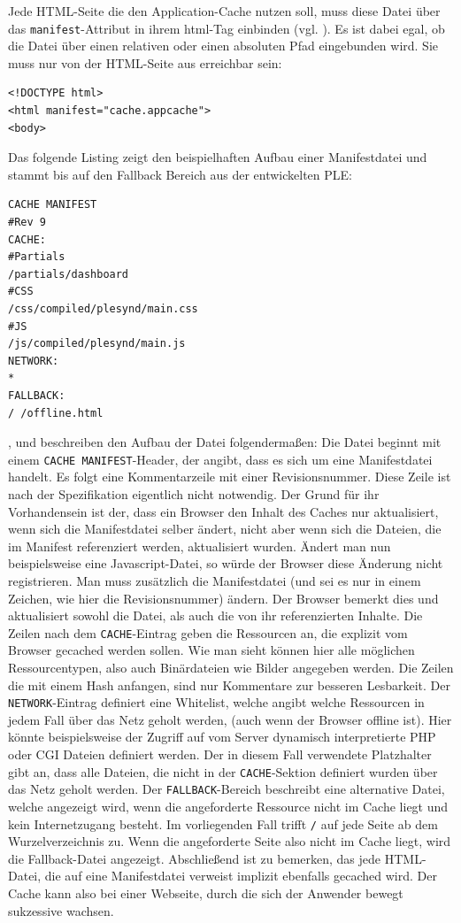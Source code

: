 Jede HTML-Seite die den Application-Cache nutzen soll, muss diese Datei über das \texttt{manifest}-Attribut in ihrem html-Tag einbinden (vgl. \cite{html5upandrunningchapter8}). Es ist dabei egal, ob die Datei über einen relativen oder einen absoluten Pfad eingebunden wird. Sie muss nur von der HTML-Seite aus erreichbar sein:
\begin{lstlisting}
<!DOCTYPE html>
<html manifest="cache.appcache">
<body>
\end{lstlisting}

Das folgende Listing zeigt den beispielhaften Aufbau einer Manifestdatei und stammt bis auf den Fallback Bereich aus der entwickelten PLE:
\begin{lstlisting}
CACHE MANIFEST
#Rev 9
CACHE:
#Partials
/partials/dashboard
#CSS
/css/compiled/plesynd/main.css
#JS
/js/compiled/plesynd/main.js
NETWORK:
*
FALLBACK:
/ /offline.html
\end{lstlisting}

\cite{W3C2012}, \cite{html5upandrunningchapter8} und \cite{Bidelman2010} beschreiben den Aufbau der Datei folgendermaßen: Die Datei beginnt mit einem \texttt{CACHE MANIFEST}-Header, der angibt, dass es sich um eine Manifestdatei handelt. Es folgt eine Kommentarzeile mit einer Revisionsnummer. Diese Zeile ist nach der Spezifikation eigentlich nicht notwendig. Der Grund für ihr Vorhandensein ist der, dass ein Browser den Inhalt des Caches nur aktualisiert, wenn sich die Manifestdatei selber ändert, nicht aber wenn sich die Dateien, die im Manifest referenziert werden, aktualisiert wurden. Ändert man nun beispielsweise eine Javascript-Datei, so würde der Browser diese Änderung nicht registrieren. Man muss zusätzlich die Manifestdatei (und sei es nur in einem Zeichen, wie hier die Revisionsnummer) ändern. Der Browser bemerkt dies und aktualisiert sowohl die Datei, als auch die von ihr referenzierten Inhalte. Die Zeilen nach dem \texttt{CACHE}-Eintrag geben die Ressourcen an, die explizit vom Browser gecached werden sollen. Wie man sieht können hier alle möglichen Ressourcentypen, also auch Binärdateien wie Bilder angegeben werden. Die Zeilen die mit einem Hash anfangen, sind nur Kommentare zur besseren Lesbarkeit. Der \texttt{NETWORK}-Eintrag definiert eine Whitelist, welche angibt welche Ressourcen in jedem Fall über das Netz geholt werden, (auch wenn der Browser offline ist). Hier könnte beispielsweise der Zugriff auf vom Server dynamisch interpretierte PHP oder CGI Dateien definiert werden. Der in diesem Fall verwendete Platzhalter gibt an, dass alle Dateien, die nicht in der \texttt{CACHE}-Sektion definiert wurden über das Netz geholt werden. Der \texttt{FALLBACK}-Bereich beschreibt eine alternative Datei, welche angezeigt wird, wenn die angeforderte Ressource nicht im Cache liegt und kein Internetzugang besteht. Im vorliegenden Fall trifft \texttt{/} auf jede Seite ab dem Wurzelverzeichnis zu. Wenn die angeforderte Seite also nicht im Cache liegt, wird die Fallback-Datei angezeigt. Abschließend ist zu bemerken, das jede HTML-Datei, die auf eine Manifestdatei verweist implizit ebenfalls gecached wird. Der Cache kann also bei einer Webseite, durch die sich der Anwender bewegt sukzessive wachsen.

